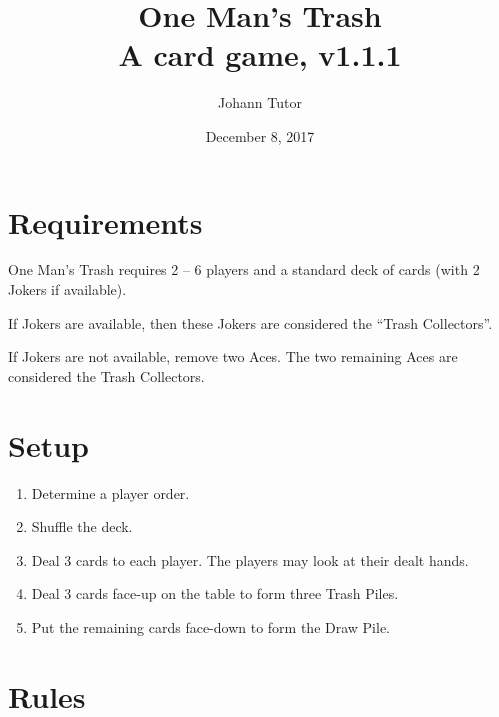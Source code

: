\documentclass{article}
\newcommand\theversion{1.1.1}
\newcommand\thegame{One Man's Trash}
\begin{document}
\title{\thegame{}\\ \large A card game, v\theversion}
\author{Johann Tutor}
\date{December 8, 2017}
\maketitle


\tableofcontents

\newpage

\section{Requirements \label{sec:requirements}}

\thegame{} requires 2 -- 6 players and a standard deck of cards (with 2 Jokers if available).

If Jokers are available, then these Jokers are considered the ``Trash Collectors''.

If Jokers are not available, remove two Aces.
The two remaining Aces are considered the Trash Collectors.

\section{Setup \label{sec:setup}}

\begin{enumerate}
  \item Determine a player order.
  \item Shuffle the deck.
  \item Deal 3 cards to each player. The players may look at their dealt hands.
  \item Deal 3 cards face-up on the table to form three Trash Piles.
  \item Put the remaining cards face-down to form the Draw Pile.
\end{enumerate}

\section{Rules \label{sec:rules}}
\end{document}
